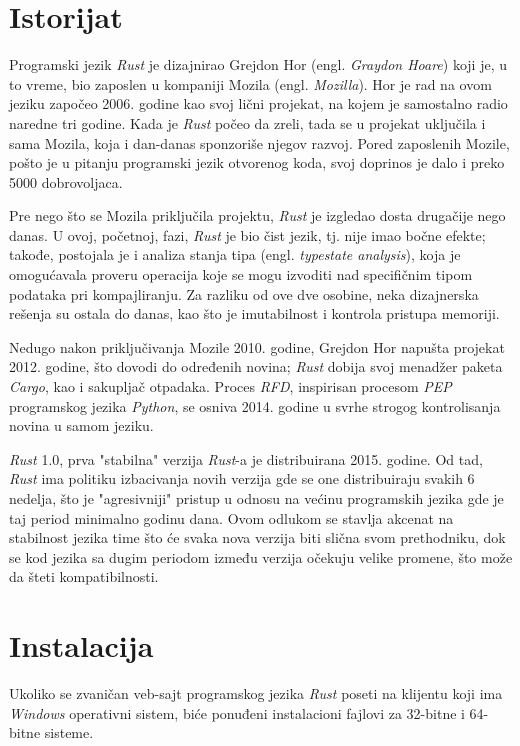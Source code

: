 \documentclass[12pt,oneside]{memoir}
\begin{document}
\section{Istorijat}
Programski jezik \emph{Rust} je dizajnirao Grejdon Hor 
(engl. \emph{Graydon Hoare}) koji je, u to vreme, bio zaposlen u kompaniji 
Mozila (engl. \emph{Mozilla}).
Hor je rad na ovom jeziku započeo 2006. godine kao svoj lični projekat, 
na kojem je samostalno radio naredne tri godine.
Kada je \emph{Rust} počeo da zreli, tada se u projekat 
uključila i sama Mozila, koja i dan-danas sponzoriše njegov razvoj.
Pored zaposlenih Mozile, pošto je u pitanju programski jezik otvorenog koda,
svoj doprinos je dalo i preko 5000 dobrovoljaca.

Pre nego što se Mozila priključila projektu, \emph{Rust} je izgledao dosta 
drugačije nego danas. U ovoj, početnoj, fazi, \emph{Rust} je bio čist jezik, 
tj. nije imao bočne efekte; takođe, postojala je i analiza stanja tipa 
(engl. \emph{typestate analysis}), koja je omogućavala proveru operacija 
koje se mogu izvoditi nad specifičnim tipom podataka pri kompajliranju. Za 
razliku od ove dve osobine, neka dizajnerska rešenja su ostala do danas, kao 
što je imutabilnost i kontrola pristupa memoriji.

Nedugo nakon priključivanja Mozile 2010. godine, Grejdon Hor napušta projekat 
2012. godine, što dovodi do određenih novina; \emph{Rust} dobija svoj menadžer 
paketa \emph{Cargo}, kao i sakupljač otpadaka. Proces \emph{RFD}, inspirisan 
procesom \emph{PEP} programskog jezika \emph{Python}, se osniva 2014. 
godine u svrhe strogog kontrolisanja novina u samom jeziku.

\emph{Rust} 1.0, prva "stabilna" verzija \emph{Rust}-a je distribuirana 2015. 
godine. Od tad, \emph{Rust} ima politiku izbacivanja novih 
verzija gde se one distribuiraju svakih 6 nedelja, što je "agresivniji" pristup 
u odnosu na većinu programskih jezika gde je taj period minimalno godinu dana. 
Ovom odlukom se stavlja akcenat na stabilnost jezika time što će svaka nova 
verzija biti slična svom prethodniku, dok se kod jezika sa dugim periodom 
između verzija očekuju velike promene, što može da šteti kompatibilnosti. 

\section{Instalacija}
Ukoliko se zvaničan veb-sajt programskog jezika \emph{Rust} poseti na 
klijentu koji ima \emph{Windows} operativni sistem, biće ponuđeni 
instalacioni fajlovi za 32-bitne i 64-bitne sisteme.
\end{document}
